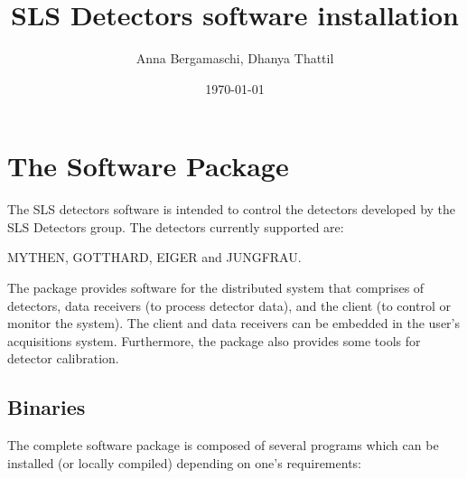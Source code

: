 \documentclass{article}
\begin{document}
\title{SLS Detectors software installation}
\author{Anna Bergamaschi, Dhanya Thattil}
\date{\today}
\maketitle
\tableofcontents
\clearpage








\section{The Software Package}
The SLS detectors software is intended to control the detectors developed by
the SLS Detectors group. The detectors currently supported are:

MYTHEN, GOTTHARD, EIGER and JUNGFRAU.\bigskip

\noindent The package provides software for the distributed system that comprises of
detectors, data receivers (to process detector data), and the client (to control
or monitor the system). The client and data receivers can be embedded in
the user's acquisitions system. Furthermore, the package also provides some
tools for detector calibration.

\subsection{Binaries}
\noindent The complete software package is composed of several programs which
can be installed (or locally compiled) depending on one's requirements:
\end{document}
